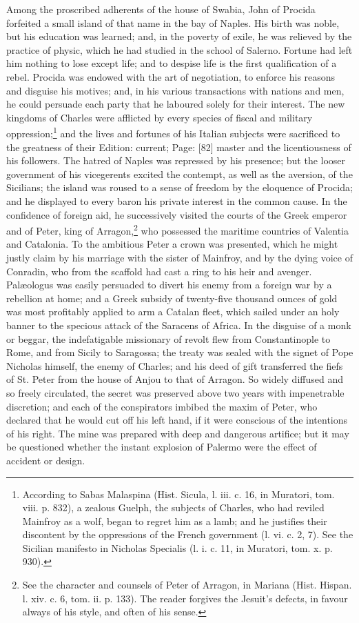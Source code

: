 Among the proscribed adherents of the house of Swabia, John of Procida forfeited a small island of that name in the bay of Naples. His birth was noble, but his education was learned; and, in the poverty of exile, he was relieved by the practice of physic, which he had studied in the school of Salerno. Fortune had left him nothing to lose except life; and to despise life is the first qualification of a rebel. Procida was endowed with the art of negotiation, to enforce his reasons and disguise his motives; and, in his various transactions with nations and men, he could persuade each party that he laboured solely for their interest. The new kingdoms of Charles were afflicted by every species of fiscal and military oppression;\footnote{According to Sabas Malaspina (Hist. Sicula, l. iii. c. 16, in Muratori, tom. viii. p. 832), a zealous Guelph, the subjects of Charles, who had reviled Mainfroy as a wolf, began to regret him as a lamb; and he justifies their discontent by the oppressions of the French government (l. vi. c. 2, 7). See the Sicilian manifesto in Nicholas Specialis (l. i. c. 11, in Muratori, tom. x. p. 930).} and the lives and fortunes of his Italian subjects were sacrificed to the greatness of their Edition: current; Page: [82] master and the licentiousness of his followers. The hatred of Naples was repressed by his presence; but the looser government of his vicegerents excited the contempt, as well as the aversion, of the Sicilians; the island was roused to a sense of freedom by the eloquence of Procida; and he displayed to every baron his private interest in the common cause. In the confidence of foreign aid, he successively visited the courts of the Greek emperor and of Peter, king of Arragon,\footnote{See the character and counsels of Peter of Arragon, in Mariana (Hist. Hispan. l. xiv. c. 6, tom. ii. p. 133). The reader forgives the Jesuit\texthebrew{}’s defects, in favour always of his style, and often of his sense.} who possessed the maritime countries of Valentia and Catalonia. To the ambitious Peter a crown was presented, which he might justly claim by his marriage with the sister of Mainfroy, and by the dying voice of Conradin, who from the scaffold had cast a ring to his heir and avenger. Palæologus was easily persuaded to divert his enemy from a foreign war by a rebellion at home; and a Greek subsidy of twenty-five thousand ounces of gold was most profitably applied to arm a Catalan fleet, which sailed under an holy banner to the specious attack of the Saracens of Africa. In the disguise of a monk or beggar, the indefatigable missionary of revolt flew from Constantinople to Rome, and from Sicily to Saragossa; the treaty was sealed with the signet of Pope Nicholas himself, the enemy of Charles; and his deed of gift transferred the fiefs of St. Peter from the house of Anjou to that of Arragon. So widely diffused and so freely circulated, the secret was preserved above two years with impenetrable discretion; and each of the conspirators imbibed the maxim of Peter, who declared that he would cut off his left hand, if it were conscious of the intentions of his right. The mine was prepared with deep and dangerous artifice; but it may be questioned whether the instant explosion of Palermo were the effect of accident or design.

